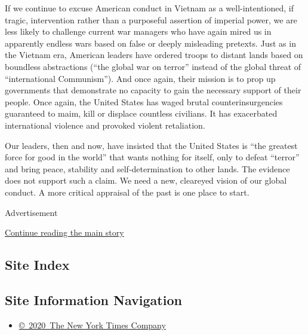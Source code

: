 If we continue to excuse American conduct in Vietnam as a
well-intentioned, if tragic, intervention rather than a purposeful
assertion of imperial power, we are less likely to challenge current war
managers who have again mired us in apparently endless wars based on
false or deeply misleading pretexts. Just as in the Vietnam era,
American leaders have ordered troops to distant lands based on boundless
abstractions (``the global war on terror'' instead of the global threat
of ``international Communism''). And once again, their mission is to
prop up governments that demonstrate no capacity to gain the necessary
support of their people. Once again, the United States has waged brutal
counterinsurgencies guaranteed to maim, kill or displace countless
civilians. It has exacerbated international violence and provoked
violent retaliation.

Our leaders, then and now, have insisted that the United States is ``the
greatest force for good in the world'' that wants nothing for itself,
only to defeat ``terror'' and bring peace, stability and
self-determination to other lands. The evidence does not support such a
claim. We need a new, cleareyed vision of our global conduct. A more
critical appraisal of the past is one place to start.

Advertisement

\protect\hyperlink{after-bottom}{Continue reading the main story}

\hypertarget{site-index}{%
\subsection{Site Index}\label{site-index}}

\hypertarget{site-information-navigation}{%
\subsection{Site Information
Navigation}\label{site-information-navigation}}

\begin{itemize}
\tightlist
\item
  \href{https://help.nytimes.com/hc/en-us/articles/115014792127-Copyright-notice}{©~2020~The
  New York Times Company}
\end{itemize}

